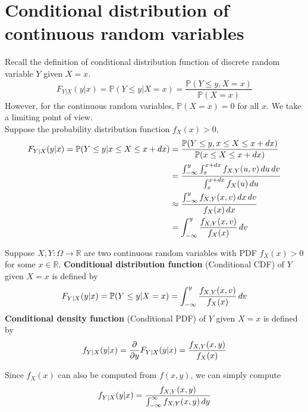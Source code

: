 \documentclass{huhtakm-template-book}
\newcommand{\prob}{\mathbb{P}}
\begin{document}
\section{Conditional distribution of continuous random variables}
    Recall the definition of conditional distribution function of discrete random variable $Y$ given $X=x$.
    \begin{equation*}
        F_{Y|X}(y|x)=\prob(Y\leq y|X=x)=\frac{\prob(Y\leq y,X=x)}{\prob(X=x)}
    \end{equation*}
    However, for the continuous random variables, $\prob(X=x)=0$ for all $x$. We take a limiting point of view.\\
    Suppose the probability distribution function $f_{X}(x)>0$,
    \begin{align*}
        F_{Y|X}(y|x)=\prob(Y\leq y|x\leq X\leq x+dx)&=\frac{\prob(Y\leq y,x\leq X\leq x+dx)}{\prob(x\leq X\leq x+dx)}\\
        &=\frac{\intlu{-\infty}{y}\intlu{x}{x+dx}f_{X,Y}(u,v)\,du\,dv}{\intlu{x}{x+dx}f_{X}(u)\,du}\\
        &\approx\frac{\intlu{-\infty}{y}f_{X,Y}(x,v)\,dx\,dv}{f_{X}(x)\,dx}\\
        &=\intlu{-\infty}{y}\frac{f_{X,Y}(x,v)}{f_{X}(x)}\,dv
    \end{align*}
    \begin{defn}
        Suppose $X,Y:\Omega\to\mathbb{R}$ are two continuous random variables with PDF $f_{X}(x)>0$ for some 
        $x\in\mathbb{R}$. \textbf{Conditional distribution function} (Conditional CDF) of $Y$ given $X=x$ is defined by
        \begin{equation*}
            F_{Y|X}(y|x)=\prob(Y\leq y|X=x)=\intlu{-\infty}{y}\frac{f_{X,Y}(x,v)}{f_{X}(x)}\,dv
        \end{equation*}
        \textbf{Conditional density function} (Conditional PDF) of $Y$ given $X=x$ is defined by
        \begin{equation*}
            f_{Y|X}(y|x)=\pdv*{F_{Y|X}(y|x)}{y}=\frac{f_{X,Y}(x,y)}{f_{X}(x)}
        \end{equation*}
    \end{defn}
    \begin{rem}
        Since $f_{X}(x)$ can also be computed from $f(x,y)$, we can simply compute
        \begin{equation*}
            f_{Y|X}(y|x)=\frac{f_{X,Y}(x,y)}{\int_{-\infty}^{\infty} f_{X,Y}(x,y)\,dy}
        \end{equation*}
    \end{rem}
\end{document}
